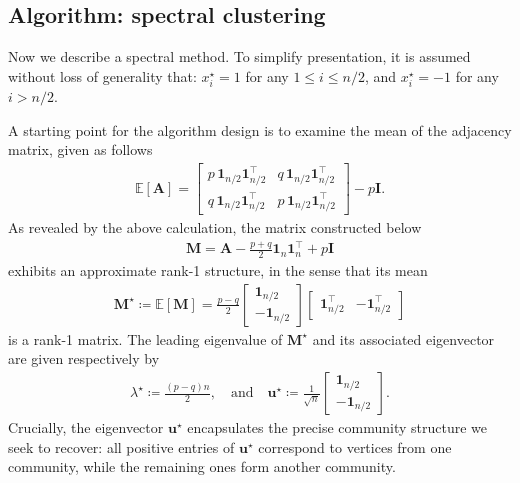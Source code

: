\subsection{Algorithm: spectral clustering}
\label{sec:algorithm-community-detection}

Now we describe a spectral method.
To simplify presentation, it is assumed without loss of generality that: $x_i^{\star}=1$ for any $1\leq i\leq n/2$, and $x_i^{\star}=-1$ for any $i > n/2$.


A starting point for the algorithm design is to examine the mean of the adjacency matrix,  given as follows
%
\begin{align*}
	 \mathbb{E}[\bm{A}]  	=
	\left[\begin{array}{cc}
		p\,\bm{1}_{n/2}\bm{1}^{\top}_{n/2} & q\,\bm{1}_{n/2}\bm{1}^{\top}_{n/2}\\
		q\,\bm{1}_{n/2}\bm{1}^{\top}_{n/2} & p\,\bm{1}_{n/2}\bm{1}^{\top}_{n/2}
	\end{array}\right] -   p \bm{I}.
\end{align*}
%
As revealed by the above calculation,   the  matrix constructed below
%
\begin{align}
	\bm{M} = \bm{A} -\frac{p+q}{2} \bm{1}_n\bm{1}^{\top}_n  + p\bm{I}
	\label{eq:M-data-matrix-SBM}
\end{align}
%
exhibits an approximate rank-1 structure, in the sense that its mean
%
\begin{align} \label{eq:M-data-matrix-expectation-SBM}
	\bm{M}^{\star} \coloneqq \mathbb{E}[\bm{M}] =
	\frac{p-q}{2}\left[\begin{array}{c}
		\bm{1}_{n/2}\\
		-\bm{1}_{n/2}
	\end{array}  \right] \left[\begin{array}{cc}
\bm{1}^{\top}_{n/2} & -\bm{1}^{\top}_{n/2}\end{array}\right]
\end{align}
%
is a rank-1 matrix.  The leading eigenvalue of $\bm{M}^{\star}$ and its associated eigenvector are given respectively by
%
\begin{align}
	\lambda^{\star}\coloneqq\frac{(p-q)n}{2},  
	\quad \text{and} \quad
	\bm{u}^{\star}  \coloneqq \frac{1}{\sqrt{n}}
	\left[\begin{array}{c}
		\bm{1}_{n/2}\\
		-\bm{1}_{n/2}
	\end{array}\right].
	\label{eq:leading-evalue-evector-M-SBM}
\end{align}
%
Crucially, the eigenvector  $\bm{u}^{\star}$ encapsulates the precise community structure we seek to recover: all positive entries of $\bm{u}^{\star}$ correspond to vertices from one community, while the remaining ones form another community.



